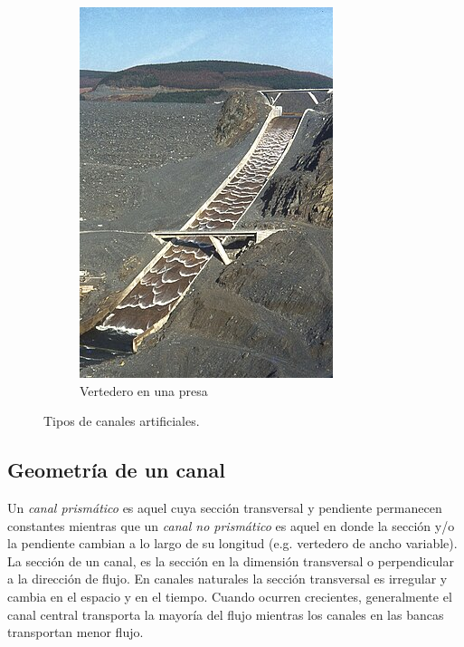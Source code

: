 \documentclass[11pt, oneside]{article}
\begin{document}
\begin{figure}
\begin{subfigure}[b]{0.32\textwidth}
         \includegraphics[width=\textwidth]{fig21c.jpg}
         \caption{Vertedero en una presa}
         \label{fig21c}
     \end{subfigure}
       \caption{Tipos de canales artificiales.}
   \end{figure}

\subsection{Geometr\'ia de un canal}
Un \emph{canal prismático} es aquel cuya sección transversal y pendiente permanecen constantes mientras que un \emph{canal no prismático} es aquel en donde la sección y/o la pendiente cambian a lo largo de su longitud (e.g. vertedero de ancho variable). La sección de un canal, es la sección en la dimensión transversal o perpendicular a la direcci\'on de flujo. En  canales naturales la secci\'on transversal es irregular y cambia en el espacio y en el tiempo. Cuando ocurren crecientes, generalmente el canal central transporta la mayoría del flujo mientras los canales en las bancas transportan menor flujo.
\end{document}
